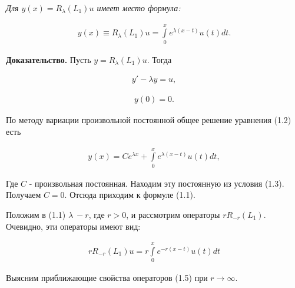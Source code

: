 \textit{Для $ y(x) = R_\lambda(L_1)u$ имеет место формула:}

\begin{equation}
\begin{array}{c}

y(x) \equiv R_\lambda(L_1)u = \int\limits_0^x e^{\lambda(x-t)}u(t)dt.

\end{array}
\end{equation}

\textbf{Доказательство.} Пусть $ y = R_\lambda(L_1)u$. Тогда

\begin{equation}
\begin{array}{c}

y'- \lambda y = u,

\end{array}
\end{equation}

\begin{equation}
\begin{array}{c}

y(0)=0.

\end{array}
\end{equation}

По методу вариации произвольной постоянной общее решение уравнения (1.2) есть

\begin{equation}
\begin{array}{c}

y(x)=Ce^{\lambda x} + \int\limits_0^x e^{\lambda(x-t)}u(t)dt,

\end{array}
\end{equation}

Где $ C $ - произвольная постоянная. Находим эту постоянную из условия (1.3). Получаем $ C = 0 $. Отсюда приходим к формуле (1.1).
	
Положим в (1.1) $ \lambda \ -r $, где $ r > 0 $, и рассмотрим операторы $ rR_{-r}(L_1)$. Очевидно, эти операторы имеют вид:

\begin{equation}
\begin{array}{c}

rR_{-r}(L_1)u = r \int\limits_0^x e^{-r(x-t)}u(t)dt

\end{array}
\end{equation}

Выясним приближающие свойства операторов (1.5) при $ r \rightarrow \infty$.

